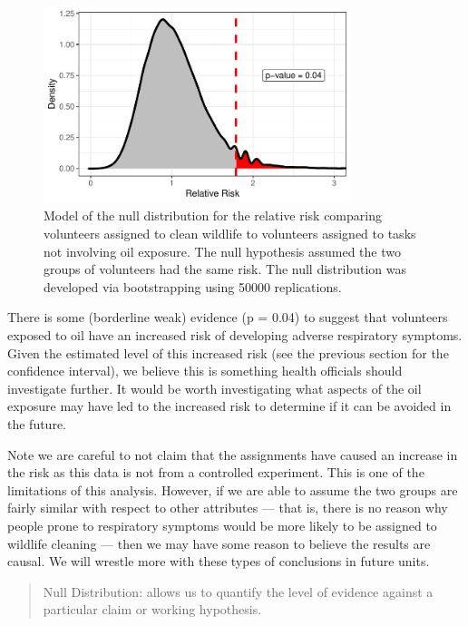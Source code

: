 \documentclass[
  letterpaper,
  DIV=11,
  numbers=noendperiod]{scrreprt}
\theoremstyle{definition}
\theoremstyle{definition}
\theoremstyle{plain}
\theoremstyle{remark}
\begin{document}
\begin{figure}

{\centering \includegraphics[width=0.8\textwidth,height=\textheight]{./images/fig-recaplanguage-null-distribution-1.pdf}

}

\caption{\label{fig-recaplanguage-null-distribution}Model of the null
distribution for the relative risk comparing volunteers assigned to
clean wildlife to volunteers assigned to tasks not involving oil
exposure. The null hypothesis assumed the two groups of volunteers had
the same risk. The null distribution was developed via bootstrapping
using 50000 replications.}

\end{figure}

There is some (borderline weak) evidence (p = 0.04) to suggest that
volunteers exposed to oil have an increased risk of developing adverse
respiratory symptoms. Given the estimated level of this increased risk
(see the previous section for the confidence interval), we believe this
is something health officials should investigate further. It would be
worth investigating what aspects of the oil exposure may have led to the
increased risk to determine if it can be avoided in the future.

Note we are careful to not claim that the assignments have caused an
increase in the risk as this data is not from a controlled experiment.
This is one of the limitations of this analysis. However, if we are able
to assume the two groups are fairly similar with respect to other
attributes --- that is, there is no reason why people prone to
respiratory symptoms would be more likely to be assigned to wildlife
cleaning --- then we may have some reason to believe the results are
causal. We will wrestle more with these types of conclusions in future
units.

\begin{quote}
Null Distribution: allows us to quantify the level of evidence against a
particular claim or working hypothesis.
\end{quote}
\end{document}
